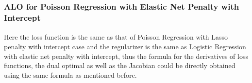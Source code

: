 \documentclass{article}
\begin{document}
\subsubsection{ALO for Poisson Regression with Elastic Net Penalty with Intercept}
\paragraph{}Here the loss function is the same as that of Poisson Regression with Lasso penalty with intercept case and the regularizer is the same as Logistic Regression with elastic net penalty with intercept, thus the formula for the derivatives of loss functions, the dual optimal as well as the Jacobian could be directly obtained using the same formula as mentioned before.
\end{document}

